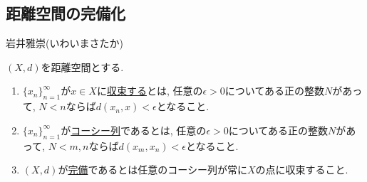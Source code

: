 \documentclass[dvipdfmx,a4paper,11pt]{article}
\newcommand{\R}{\mathbb{R}}
\theoremstyle{definition}
\begin{document}
\newpage


\begin{center}
\section{距離空間の完備化}
\label{sec-completion}
\end{center}

\begin{flushright}
 岩井雅崇(いわいまさたか)
\end{flushright}

 \begin{tcolorbox}[
    colback = white,
    colframe = green!35!black,
    fonttitle = \bfseries,
    breakable = true]
$(X,d)$を距離空間とする.
\begin{enumerate}
\setlength{\parskip}{0cm}
  \setlength{\itemsep}{0pt} 
  \item $\{ x_n\}_{n=1}^{\infty}$が$x \in X$に\underline{収束する}とは,  任意の$\epsilon>0$についてある正の整数$N$があって, $N < n$ならば$d(x_n,x)<\epsilon$となること.
	\item $\{ x_n\}_{n=1}^{\infty}$が\underline{コーシー列}であるとは, 任意の$\epsilon>0$についてある正の整数$N$があって, $N < m,n$ならば$d(x_m,x_n)<\epsilon$となること.
	\item $(X,d)$が\underline{完備}であるとは任意のコーシー列が常に$X$の点に収束すること.
\end{enumerate}
\end{tcolorbox}

\end{document}
